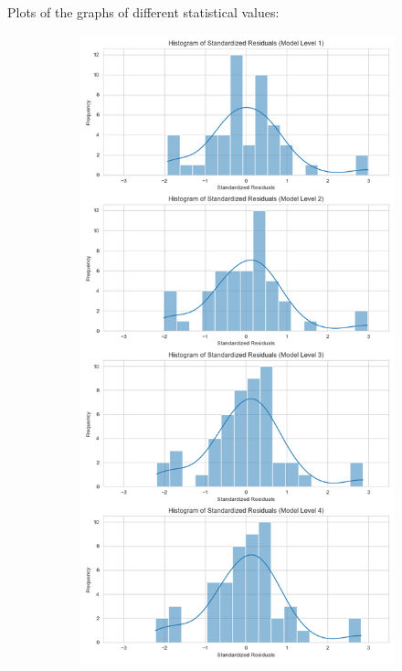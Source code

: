 \documentclass[11pt, oneside]{article}   	%
\begin{document}
Plots of the graphs of different statistical values:
\begin{figure}[H]
\centering
\begin{subfigure}{.5\textwidth}
  \centering
  \includegraphics[width=\linewidth]{../plots/fnn_data/hierarchy1/histogram_std_residuals}

\end{subfigure}
\end{figure}
\end{document}
